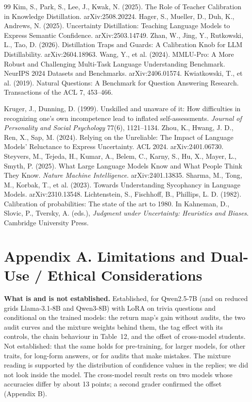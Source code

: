 \documentclass[10pt]{article}
\begin{document}
\begin{thebibliography}{99}
 Kim, S., Park, S., Lee, J., Kwak, N. (2025). The Role of Teacher Calibration in Knowledge Distillation. arXiv:2508.20224.
 Hager, S., Mueller, D., Duh, K., Andrews, N. (2025). Uncertainty Distillation: Teaching Language Models to Express Semantic Confidence. arXiv:2503.14749.
 Zhan, W., Jing, Y., Rutkowski, L., Tao, D. (2026). Distillation Traps and Guards: A Calibration Knob for LLM Distillability. arXiv:2604.18963.
 Wang, Y., et al. (2024). MMLU-Pro: A More Robust and Challenging Multi-Task Language Understanding Benchmark. NeurIPS 2024 Datasets and Benchmarks. arXiv:2406.01574.
 Kwiatkowski, T., et al. (2019). Natural Questions: A Benchmark for Question Answering Research. Transactions of the ACL 7, 453--466.

 Kruger, J., Dunning, D. (1999). Unskilled and unaware of it: How difficulties in recognizing one's own incompetence lead to inflated self-assessments. \emph{Journal of Personality and Social Psychology} 77(6), 1121--1134.
 Zhou, K., Hwang, J. D., Ren, X., Sap, M. (2024). Relying on the Unreliable: The Impact of Language Models' Reluctance to Express Uncertainty. ACL 2024. arXiv:2401.06730.
 Steyvers, M., Tejeda, H., Kumar, A., Belem, C., Karny, S., Hu, X., Mayer, L., Smyth, P. (2025). What Large Language Models Know and What People Think They Know. \emph{Nature Machine Intelligence}. arXiv:2401.13835.
 Sharma, M., Tong, M., Korbak, T., et al. (2023). Towards Understanding Sycophancy in Language Models. arXiv:2310.13548.
 Lichtenstein, S., Fischhoff, B., Phillips, L. D. (1982). Calibration of probabilities: The state of the art to 1980. In Kahneman, D., Slovic, P., Tversky, A. (eds.), \emph{Judgment under Uncertainty: Heuristics and Biases}. Cambridge University Press.
\end{thebibliography}

\section*{Appendix A. Limitations and Dual-Use / Ethical Considerations}

\textbf{What is and is not established.} Established, for Qwen2.5-7B (and on reduced grids Llama-3.1-8B and Qwen3-8B) with LoRA on trivia questions and conditional on the trained models: the return map's gain without audits, the two audit curves and the mixture weights behind them, the tag effect with its controls, the chain behaviour in Table~12, and the offset of cross-model students. Not established: that the same holds for pre-training, for larger models, for other traits, for long-form answers, or for audits that make mistakes. The mixture reading is supported by the distribution of confidence values in the replies; we did not look inside the model. The cross-model result rests on two models whose accuracies differ by about 13 points; a second grader confirmed the offset (Appendix B).
\end{document}

